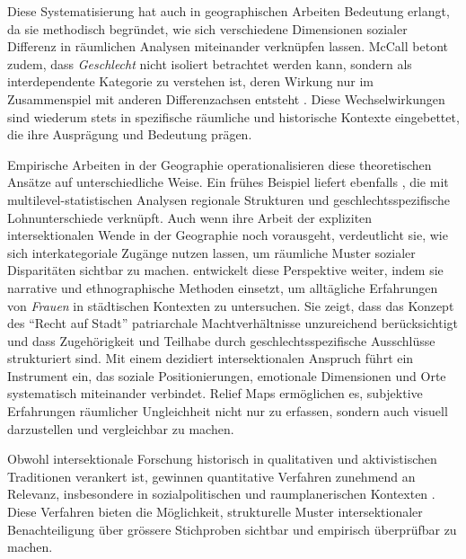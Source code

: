 Diese Systematisierung hat auch in geographischen Arbeiten Bedeutung erlangt, da sie methodisch begründet, wie sich verschiedene Dimensionen sozialer Differenz in räumlichen Analysen miteinander verknüpfen lassen. McCall betont zudem, dass \emph{Geschlecht} nicht isoliert betrachtet werden kann, sondern als interdependente Kategorie zu verstehen ist, deren Wirkung nur im Zusammenspiel mit anderen Differenzachsen entsteht \parencite{mccallSpatialRoutesGender1998}. Diese Wechselwirkungen sind wiederum stets in spezifische räumliche und historische Kontexte eingebettet, die ihre Ausprägung und Bedeutung prägen.

Empirische Arbeiten in der Geographie operationalisieren diese theoretischen Ansätze auf unterschiedliche Weise. Ein frühes Beispiel liefert ebenfalls \textcite{mccallSpatialRoutesGender1998}, die mit multilevel-statistischen Analysen regionale Strukturen und geschlechtsspezifische Lohnunterschiede verknüpft. Auch wenn ihre Arbeit der expliziten intersektionalen Wende in der Geographie noch vorausgeht, verdeutlicht sie, wie sich interkategoriale Zugänge nutzen lassen, um räumliche Muster sozialer Disparitäten sichtbar zu machen. \textcite{fensterRightGenderedCity2005} entwickelt diese Perspektive weiter, indem sie narrative und ethnographische Methoden einsetzt, um alltägliche Erfahrungen von \emph{Frauen} in städtischen Kontexten zu untersuchen. Sie zeigt, dass das Konzept des \enquote{Recht auf Stadt} \parencite[siehe][]{lefebvreDroitVille1967} patriarchale Machtverhältnisse unzureichend berücksichtigt und dass Zugehörigkeit und Teilhabe durch geschlechtsspezifische Ausschlüsse strukturiert sind. Mit einem dezidiert intersektionalen Anspruch führt \textcite{rodo-de-zarateDevelopingGeographiesIntersectionality2014} ein Instrument ein, das soziale Positionierungen, emotionale Dimensionen und Orte systematisch miteinander verbindet. Relief Maps ermöglichen es, subjektive Erfahrungen räumlicher Ungleichheit nicht nur zu erfassen, sondern auch visuell darzustellen und vergleichbar zu machen.

\vspace{2em}

Obwohl intersektionale Forschung historisch in qualitativen und aktivistischen Traditionen verankert ist, gewinnen quantitative Verfahren zunehmend an Relevanz, insbesondere in sozialpolitischen und raumplanerischen Kontexten \parencite{bauerIntersectionalityQuantitativeResearch2021}. Diese Verfahren bieten die Möglichkeit, strukturelle Muster intersektionaler Benachteiligung über grössere Stichproben sichtbar und empirisch überprüfbar zu machen.

